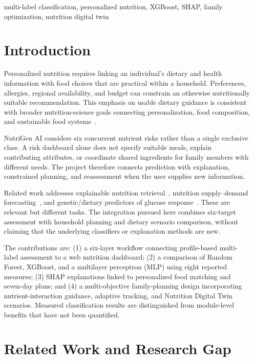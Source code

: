 \documentclass[conference]{IEEEtran}
\begin{document}
\begin{IEEEkeywords}
multi-label classification, personalized nutrition, XGBoost, SHAP, family optimization, nutrition digital twin
\end{IEEEkeywords}

\section{Introduction}
Personalized nutrition requires linking an individual's dietary and health information with food choices that are practical within a household. Preferences, allergies, regional availability, and budget can constrain an otherwise nutritionally suitable recommendation. This emphasis on usable dietary guidance is consistent with broader nutrition-science goals connecting personalization, food composition, and sustainable food systems~\cite{berry2026goals}.

NutriGen AI considers six concurrent nutrient risks rather than a single exclusive class. A risk dashboard alone does not specify suitable meals, explain contributing attributes, or coordinate shared ingredients for family members with different needs. The project therefore connects prediction with explanation, constrained planning, and reassessment when the user supplies new information.

Related work addresses explainable nutrition retrieval~\cite{dindukurthi2026explainable}, nutrition supply--demand forecasting~\cite{abdullah2026leakage}, and genetic/dietary predictors of glucose response~\cite{reik2023genetic}. These are relevant but different tasks. The integration pursued here combines six-target assessment with household planning and dietary scenario comparison, without claiming that the underlying classifiers or explanation methods are new.

The contributions are: (1) a six-layer workflow connecting profile-based multi-label assessment to a web nutrition dashboard; (2) a comparison of Random Forest, XGBoost, and a multilayer perceptron (MLP) using eight reported measures; (3) SHAP explanations linked to personalized food matching and seven-day plans; and (4) a multi-objective family-planning design incorporating nutrient-interaction guidance, adaptive tracking, and Nutrition Digital Twin scenarios. Measured classification results are distinguished from module-level benefits that have not been quantified.

\section{Related Work and Research Gap}
\end{document}
